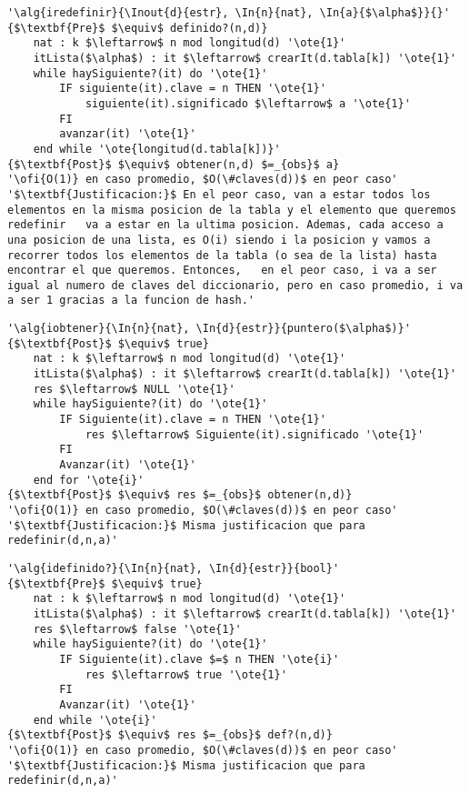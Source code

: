 \begin{lstlisting}[mathescape]
'\alg{iredefinir}{\Inout{d}{estr}, \In{n}{nat}, \In{a}{$\alpha$}}{}'
{$\textbf{Pre}$ $\equiv$ definido?(n,d)}
	nat : k $\leftarrow$ n mod longitud(d) '\ote{1}'
	itLista($\alpha$) : it $\leftarrow$ crearIt(d.tabla[k]) '\ote{1}'
	while haySiguiente?(it) do '\ote{1}'
		IF siguiente(it).clave = n THEN '\ote{1}'
			siguiente(it).significado $\leftarrow$ a '\ote{1}'
		FI
		avanzar(it) '\ote{1}'
	end while '\ote{longitud(d.tabla[k])}'
{$\textbf{Post}$ $\equiv$ obtener(n,d) $=_{obs}$ a}
'\ofi{O(1)} en caso promedio, $O(\#claves(d))$ en peor caso'
'$\textbf{Justificacion:}$ En el peor caso, van a estar todos los elementos en la misma posicion de la tabla y el elemento que queremos redefinir	va a estar en la ultima posicion. Ademas, cada acceso a una posicion de	una lista, es O(i) siendo i la posicion y vamos a recorrer todos los elementos de la tabla (o sea de la lista) hasta encontrar el que queremos. Entonces,	en el peor caso, i va a ser igual al numero de claves del diccionario, pero en caso promedio, i va a ser 1 gracias a la funcion de hash.'
\end{lstlisting}

\begin{lstlisting}[mathescape]
'\alg{iobtener}{\In{n}{nat}, \In{d}{estr}}{puntero($\alpha$)}'
{$\textbf{Post}$ $\equiv$ true}
	nat : k $\leftarrow$ n mod longitud(d) '\ote{1}'
	itLista($\alpha$) : it $\leftarrow$ crearIt(d.tabla[k]) '\ote{1}'
	res $\leftarrow$ NULL '\ote{1}'
	while haySiguiente?(it) do '\ote{1}'
		IF Siguiente(it).clave = n THEN '\ote{1}'
			res $\leftarrow$ Siguiente(it).significado '\ote{1}'
		FI
		Avanzar(it) '\ote{1}'
	end for '\ote{i}'
{$\textbf{Post}$ $\equiv$ res $=_{obs}$ obtener(n,d)}
'\ofi{O(1)} en caso promedio, $O(\#claves(d))$ en peor caso'
'$\textbf{Justificacion:}$ Misma justificacion que para redefinir(d,n,a)'
\end{lstlisting}

\begin{lstlisting}[mathescape]
'\alg{idefinido?}{\In{n}{nat}, \In{d}{estr}}{bool}'
{$\textbf{Pre}$ $\equiv$ true}
	nat : k $\leftarrow$ n mod longitud(d) '\ote{1}'
	itLista($\alpha$) : it $\leftarrow$ crearIt(d.tabla[k]) '\ote{1}'
	res $\leftarrow$ false '\ote{1}'
	while haySiguiente?(it) do '\ote{1}'
		IF Siguiente(it).clave $=$ n THEN '\ote{i}'
			res $\leftarrow$ true '\ote{1}'
		FI
		Avanzar(it) '\ote{1}'
	end while '\ote{i}'
{$\textbf{Post}$ $\equiv$ res $=_{obs}$ def?(n,d)}
'\ofi{O(1)} en caso promedio, $O(\#claves(d))$ en peor caso'
'$\textbf{Justificacion:}$ Misma justificacion que para redefinir(d,n,a)'
\end{lstlisting}


